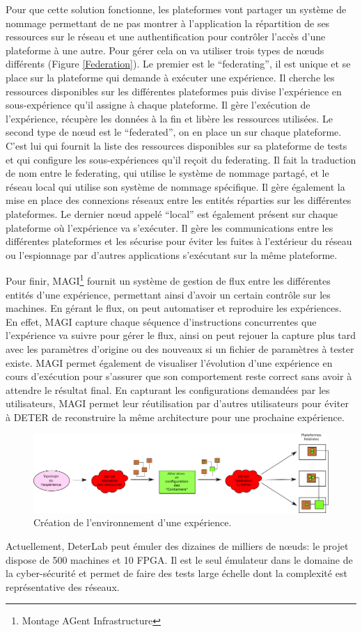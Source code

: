 Pour que cette solution fonctionne, les plateformes vont partager un système de
nommage permettant de ne pas montrer à l'application la répartition de ses
ressources sur le réseau et une authentification pour contrôler l'accès d'une
plateforme à une autre. Pour gérer cela on va utiliser trois types de n\oe uds
différents (Figure \ref{Federation}). Le premier est le ``federating'', il est
unique et se place sur la plateforme qui demande à exécuter une expérience. Il
cherche les ressources disponibles sur les différentes plateformes puis divise
l'expérience en sous-expérience qu'il assigne à chaque plateforme. Il gère
l'exécution de l'expérience, récupère les données à la fin et
libère les ressources utilisées. Le second type de n\oe ud est le ``federated'',
on en place un sur chaque plateforme. C'est lui qui fournit la liste des
ressources disponibles sur sa plateforme de tests et qui configure les
sous-expériences qu'il reçoit du federating. Il fait la traduction de nom entre
le federating, qui utilise le système de nommage partagé, et le réseau local qui
utilise son système de nommage spécifique.  Il gère également la mise en place
des connexions réseaux entre les entités réparties sur les différentes
plateformes. Le dernier n\oe ud appelé ``local'' est également présent sur
chaque plateforme où l'expérience va s'exécuter. Il gère les communications
entre les différentes plateformes et les sécurise pour éviter les fuites à
l'extérieur du réseau ou l'espionnage par d'autres applications s'exécutant sur
la même plateforme.

Pour finir, MAGI\footnote{Montage AGent Infrastructure} fournit un système de
gestion de flux entre les différentes entités d'une expérience, permettant ainsi
d'avoir un certain contrôle sur les machines. En gérant le flux, on peut
automatiser et reproduire les expériences. En effet, MAGI capture chaque
séquence d'instructions concurrentes que l'expérience va suivre pour gérer le
flux, ainsi on peut rejouer la capture plus tard avec les paramètres d'origine
ou des nouveaux si un fichier de paramètres à tester existe. MAGI permet
également de visualiser l'évolution d'une expérience en cours d'exécution pour
s'assurer que son comportement reste correct sans avoir à attendre le résultat
final. En capturant les configurations demandées par les utilisateurs, MAGI
permet leur réutilisation par d'autres utilisateurs pour éviter à DETER de
reconstruire la même architecture pour une prochaine expérience.

\begin{figure}[H]
\centering
\includegraphics[scale=0.63]{Pictures/png/Deter_fonctionnement_general}
\caption{Création de l'environnement d'une expérience.}
\label{Deter_fonc}
\end{figure}

 Actuellement, DeterLab peut émuler des dizaines de milliers de n\oe uds: le
 projet dispose de 500 machines et 10 FPGA. Il est le seul émulateur dans le
 domaine de la cyber-sécurité et permet de faire des tests large échelle dont la
 complexité est représentative des réseaux.
